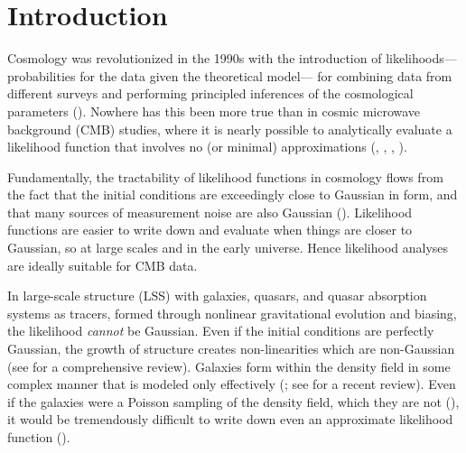 

\section{Introduction}

Cosmology was revolutionized in the 1990s with the introduction of likelihoods---%
pro\-ba\-bil\-ities for the data given the theoretical model---%
for combining data from different surveys and performing principled inferences of
the cosmological parameters (\citealt{White:1996aa, Riess:1998aa}). 
Nowhere has this been more true than in cosmic microwave background (CMB) studies,
where it is nearly possible to analytically evaluate a likelihood function that
involves no (or minimal) approximations (\citealt{Oh:1999aa}, \citealt{Wandelt:2004aa},  
\citealt{Eriksen:2004aa}, \citealt{planckI, planckII}). 

Fundamentally, the tractability of likelihood functions in cosmology flows from
the fact that the initial conditions are exceedingly close to Gaussian in form,
and that many sources of measurement noise are also Gaussian (\citealt{Knox:1995aa}).
Likelihood functions are easier to write down and evaluate when things are closer 
to Gaussian, so at large scales and in the early universe. Hence likelihood analyses 
are ideally suitable for CMB data. 

In large-scale structure (LSS) with galaxies, quasars, and quasar absorption systems as tracers,
formed through nonlinear gravitational evolution and biasing, the likelihood {\em cannot} be Gaussian. 
Even if the initial conditions are perfectly Gaussian, the growth of structure creates non-linearities 
which are non-Gaussian (see \citealt{Bernardeau:2002aa} for a comprehensive review). 
Galaxies form within the density field in some complex manner that is modeled only effectively
(\citealt{Dressler:1980aa, kaiser1984, Santiago:1992aa, Steidel:1998aa}; see \citealt{somerville15} for a recent review).  
Even if the galaxies were a Poisson sampling of the density field, which they are not (\citealt{Mo:1996aa, somerville2001, Casas-Miranda:2002aa}), it would be tremendously difficult to write down even 
an approximate likelihood function (\citealt{ata2015}).

